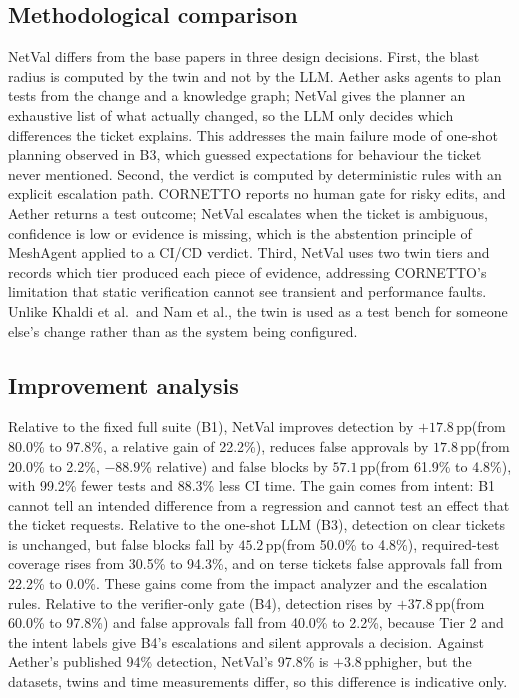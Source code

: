 \documentclass[pdflatex,iicol,sn-mathphys-num]{sn-jnl}%
\newcommand{\pp}{\,pp}
\theoremstyle{thmstyletwo}%
\begin{document}
\subsection{Methodological comparison}\label{sec:methodcomp}

NetVal differs from the base papers in three design decisions. First, the blast radius is computed by the twin and not by the LLM. Aether asks agents to plan tests from the change and a knowledge graph; NetVal gives the planner an exhaustive list of what actually changed, so the LLM only decides which differences the ticket explains. This addresses the main failure mode of one-shot planning observed in B3, which guessed expectations for behaviour the ticket never mentioned. Second, the verdict is computed by deterministic rules with an explicit escalation path. CORNETTO reports no human gate for risky edits, and Aether returns a test outcome; NetVal escalates when the ticket is ambiguous, confidence is low or evidence is missing, which is the abstention principle of MeshAgent applied to a CI/CD verdict. Third, NetVal uses two twin tiers and records which tier produced each piece of evidence, addressing CORNETTO's limitation that static verification cannot see transient and performance faults. Unlike Khaldi et al.\ and Nam et al., the twin is used as a test bench for someone else's change rather than as the system being configured.

\subsection{Improvement analysis}\label{sec:improvement}

Relative to the fixed full suite (B1), NetVal improves detection by $+17.8$\pp (from 80.0\% to 97.8\%, a relative gain of 22.2\%), reduces false approvals by $17.8$\pp (from 20.0\% to 2.2\%, $-88.9$\% relative) and false blocks by $57.1$\pp (from 61.9\% to 4.8\%), with 99.2\% fewer tests and 88.3\% less CI time. The gain comes from intent: B1 cannot tell an intended difference from a regression and cannot test an effect that the ticket requests. Relative to the one-shot LLM (B3), detection on clear tickets is unchanged, but false blocks fall by $45.2$\pp (from 50.0\% to 4.8\%), required-test coverage rises from 30.5\% to 94.3\%, and on terse tickets false approvals fall from 22.2\% to 0.0\%. These gains come from the impact analyzer and the escalation rules. Relative to the verifier-only gate (B4), detection rises by $+37.8$\pp (from 60.0\% to 97.8\%) and false approvals fall from 40.0\% to 2.2\%, because Tier 2 and the intent labels give B4's escalations and silent approvals a decision. Against Aether's published 94\% detection, NetVal's 97.8\% is $+3.8$\pp higher, but the datasets, twins and time measurements differ, so this difference is indicative only.
\end{document}
